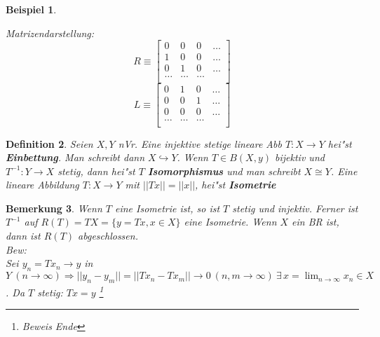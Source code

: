\documentclass[a4paper,11pt]{book}
\newcommand{\begriff}[1]{\textbf{#1}} %
\newtheorem{Def}{Definition}[chapter]
\newtheorem{Bsp}[Def]{Beispiel}
\newtheorem{Bem}[Def]{Bemerkung}
\theoremstyle{nonumberplain}
\begin{document}
\begin{Bsp}
\begin{enumerate}
Matrizendarstellung:
\[
R \equiv \left[ \begin{array}{cccc}
0 & 0 & 0 & \dots \\
1 & 0 & 0 & \dots \\
0 & 1 & 0 & \dots \\
\hdots & \hdots & \hdots & \\
\end{array} \right]
\]
\[
L \equiv \left[ \begin{array}{cccc}
0 & 1 & 0 & \dots \\
0 & 0 & 1 & \dots \\
0 & 0 & 0 & \dots \\
\hdots & \hdots & \hdots & \\
\end{array} \right]
\]
\end{enumerate}
\end{Bsp}

\begin{Def}
Seien $X,Y$ nVr. Eine injektive stetige lineare Abb $T: X \rightarrow Y$ hei"st \begriff{Einbettung}. Man schreibt dann $X \hookrightarrow Y$. Wenn $T \in B(X,y)$ bijektiv und $T^{-1}: Y \rightarrow X$ stetig, dann hei"st $T$ \begriff{Isomorphismus} und man schreibt $X \cong Y$. Eine lineare Abbildung $T: X \rightarrow Y$ mit $||Tx|| = ||x||$, hei"st \begriff{Isometrie}
\end{Def}

\begin{Bem}
Wenn $T$ eine Isometrie ist, so ist $T$ stetig und injektiv. Ferner ist $T^{-1}$ auf $R(T) = TX = \{ y = Tx, x \in X \}$ eine Isometrie. Wenn $X$ ein BR ist, dann ist $R(T)$ abgeschlossen.\\
\emph{Bew:}\\
Sei $y_n = Tx_n \rightarrow y$ in $Y \ (n \rightarrow \infty) \Rightarrow ||y_n - y_m|| = ||Tx_n - Tx_m|| \rightarrow 0 \ (n,m \rightarrow \infty) \ \exists\, x = \lim_{n \rightarrow \infty} x_n \in X$. Da $T$ stetig: $Tx = y$ \footnote{Beweis Ende}
\end{Bem}
\end{document}
